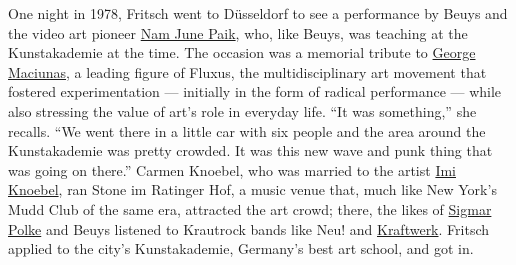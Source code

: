 One night in 1978, Fritsch went to Düsseldorf to see a performance by
Beuys and the video art pioneer
\href{https://www.nytimes3xbfgragh.onion/2006/01/31/arts/design/nam-june-paik-73-dies-pioneer-of-video-art-whose-work-broke.html}{Nam
June Paik}, who, like Beuys, was teaching at the Kunstakademie at the
time. The occasion was a memorial tribute to
\href{https://www.nytimes3xbfgragh.onion/1978/05/11/archives/george-maciunas-artist-and-designer-organized-fluxus-to-develop.html}{George
Maciunas}, a leading figure of Fluxus, the multidisciplinary art
movement that fostered experimentation --- initially in the form of
radical performance --- while also stressing the value of art's role in
everyday life. ``It was something,'' she recalls. ``We went there in a
little car with six people and the area around the Kunstakademie was
pretty crowded. It was this new wave and punk thing that was going on
there.'' Carmen Knoebel, who was married to the artist
\href{http://www.artnet.com/artists/imi-knoebel/}{Imi Knoebel}, ran
Stone im Ratinger Hof, a music venue that, much like New York's Mudd
Club of the same era, attracted the art crowd; there, the likes of
\href{https://www.nytimes3xbfgragh.onion/topic/person/sigmar-polke}{Sigmar
Polke} and Beuys listened to Krautrock bands like Neu! and
\href{https://www.nytimes3xbfgragh.onion/2012/04/16/arts/music/talking-to-ralf-hutter-of-kraftwerk.html}{Kraftwerk}.
Fritsch applied to the city's Kunstakademie, Germany's best art school,
and got in.

